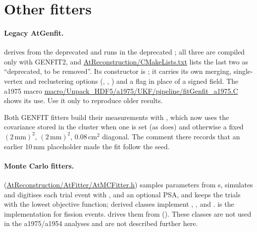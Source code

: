 \section{Other fitters}
\label{sec:fit-other}

\paragraph{Legacy AtGenfit.}  derives from the deprecated  and runs in the
deprecated ; all three are compiled only with GENFIT2, and
\url{AtReconstruction/CMakeLists.txt} lists the last two as ``deprecated, to be removed''. Its constructor is
; it carries its own merging, single-vertex and reclustering options
(, , ) and a
 flag in place of a signed field. The a1975 macro
\url{macro/Unpack_HDF5/a1975/UKF/pipeline/fitGenfit_a1975.C} shows its use. Use it only to reproduce older results.

Both GENFIT fitters build their measurements with , which now uses the covariance
stored in the cluster when one is set (as  does) and otherwise a fixed $(2\,\mathrm{mm})^2$,
$(2\,\mathrm{mm})^2$, $0.08$\,cm$^2$ diagonal. The comment there records that an earlier 10\,mm placeholder made the fit
follow the seed.

\paragraph{Monte Carlo fitters.}  (\url{AtReconstruction/AtFitter/AtMCFitter.h}) samples
parameters from s, simulates and digitises each trial event with ,
 and an optional PSA, and keeps the trials with the lowest objective function; derived classes implement
, ,  and .
 is the implementation for fission events.  drives them from
 (). These classes are not used in the a1975/a1954 analyses and are not
described further here.

